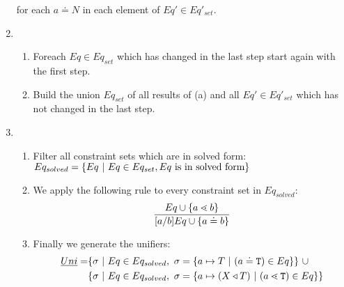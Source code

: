 \begin{enumerate}
      for each $a \doteq N$ in each element of $Eq' \in Eq'_{set}$.

\item 
    \begin{enumerate}
    \item Foreach $Eq \in Eq_{set}$ which has changed in the last step
      start again with the first step.
    \item Build the union $Eq_{set}$ of all results of (a) and all $Eq' \in
      Eq'_{set}$ which has not changed in the last step.
    \end{enumerate}
\item
\begin{enumerate}
  \item Filter all constraint sets which are in solved
  form:\\
$Eq_{solved} = \{  Eq \ | \ Eq \in Eq_{set}, Eq \ \text{is in solved form} \}$
\item We apply the following rule to every constraint set in $Eq_{solved}$:
\begin{align*}
\ddfrac{
  Eq \cup \set{ a \lessdot b } %
}{
  [a/b]Eq \cup \set{ a \doteq b }
}
\end{align*}
\item Finally we generate the unifiers:
\begin{align*}
    \emph{Uni} = &
   \{ \sigma \ | \ Eq \in Eq_{solved},\ \sigma = \{ a \mapsto T \ | \ (a \doteq \texttt{T}) \in Eq \}  \} \ \cup \\
   & \{ \sigma \ | \ Eq \in Eq_{solved},\ \sigma = \{ a \mapsto (X \triangleleft T) \ | \ (a \lessdot \texttt{T}) \in Eq \}  \}
\end{align*}
\end{enumerate}
\end{enumerate}


